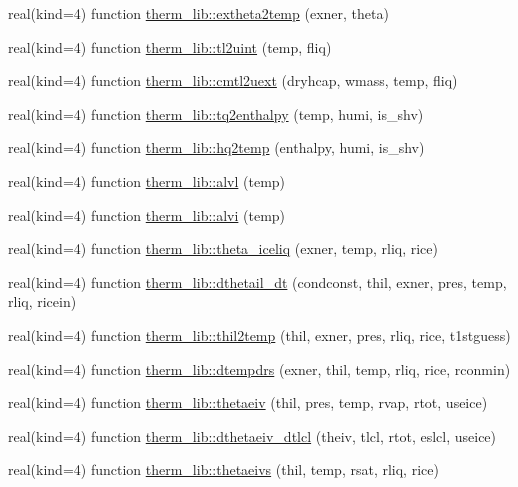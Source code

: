 \begin{DoxyCompactItemize}
\item 
real(kind=4) function \hyperlink{namespacetherm__lib_a04fbafe4252bacbd01867388f45d8104}{therm\+\_\+lib\+::extheta2temp} (exner, theta)
\item 
real(kind=4) function \hyperlink{namespacetherm__lib_a3ad59a4037ed8ed57532b8ea630a7df1}{therm\+\_\+lib\+::tl2uint} (temp, fliq)
\item 
real(kind=4) function \hyperlink{namespacetherm__lib_a2db60e1f300fadcd09ef451059aa571b}{therm\+\_\+lib\+::cmtl2uext} (dryhcap, wmass, temp, fliq)
\item 
real(kind=4) function \hyperlink{namespacetherm__lib_addd05382298a8487d09d7f6e2664dd62}{therm\+\_\+lib\+::tq2enthalpy} (temp, humi, is\+\_\+shv)
\item 
real(kind=4) function \hyperlink{namespacetherm__lib_ad10129810640ad98a16dde22a0c244b8}{therm\+\_\+lib\+::hq2temp} (enthalpy, humi, is\+\_\+shv)
\item 
real(kind=4) function \hyperlink{namespacetherm__lib_a543f4c6ab155d99ad9a5002a8143a654}{therm\+\_\+lib\+::alvl} (temp)
\item 
real(kind=4) function \hyperlink{namespacetherm__lib_a4fbc9bf6cc7bc66ef4c68393149d7288}{therm\+\_\+lib\+::alvi} (temp)
\item 
real(kind=4) function \hyperlink{namespacetherm__lib_a15a79fc7dd2aaabe7bc7da287e531324}{therm\+\_\+lib\+::theta\+\_\+iceliq} (exner, temp, rliq, rice)
\item 
real(kind=4) function \hyperlink{namespacetherm__lib_a75e26a63ab4d3f6ea5f45315bf30f91b}{therm\+\_\+lib\+::dthetail\+\_\+dt} (condconst, thil, exner, pres, temp, rliq, ricein)
\item 
real(kind=4) function \hyperlink{namespacetherm__lib_ac1f38c4afbbc3cf5a540d4e87c8b22c8}{therm\+\_\+lib\+::thil2temp} (thil, exner, pres, rliq, rice, t1stguess)
\item 
real(kind=4) function \hyperlink{namespacetherm__lib_a98f9f548762461093dfbe7604fcc5601}{therm\+\_\+lib\+::dtempdrs} (exner, thil, temp, rliq, rice, rconmin)
\item 
real(kind=4) function \hyperlink{namespacetherm__lib_a2523d158beee975faaed4552724aae65}{therm\+\_\+lib\+::thetaeiv} (thil, pres, temp, rvap, rtot, useice)
\item 
real(kind=4) function \hyperlink{namespacetherm__lib_a46f478124e2b8b34a4f64e13df4a9713}{therm\+\_\+lib\+::dthetaeiv\+\_\+dtlcl} (theiv, tlcl, rtot, eslcl, useice)
\item 
real(kind=4) function \hyperlink{namespacetherm__lib_a59bae4be9ba9f862c7b58953f37a9be2}{therm\+\_\+lib\+::thetaeivs} (thil, temp, rsat, rliq, rice)

\end{DoxyCompactItemize}
